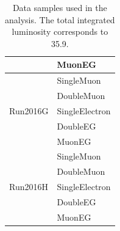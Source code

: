 \begin{table}
\begin{center}
\begin{tabular}{|l|l|}
                                & MuonEG \\ \hline
\multirow{5}{*}{Run2016G}       & SingleMuon  \\
                                & DoubleMuon \\
                                & SingleElectron \\
                                & DoubleEG \\
                                & MuonEG \\ \hline
\multirow{5}{*}{Run2016H}       & SingleMuon  \\
                                & DoubleMuon \\
                                & SingleElectron \\
                                & DoubleEG \\
                                & MuonEG \\ \hline
\hline 
\end{tabular}
\caption{Data samples used in the analysis. The total integrated luminosity corresponds to 35.9\fbinv.
\label{tab:data}}
\end{center}
\end{table}






